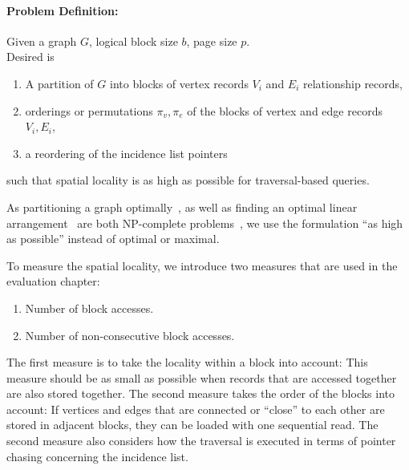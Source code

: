     \paragraph{Problem Definition:} Given a graph $G$, logical block size $b$, page size $p$. \\
    Desired is 
    \begin{enumerate}
     \item A partition of $G$ into blocks of vertex records $V_i$ and $E_i$ relationship records, 
     \item orderings or permutations $\pi_v, \pi_e$ of the blocks of vertex and edge records $V_i, E_i$,
     \item a reordering of the incidence list pointers
    \end{enumerate}
    such that spatial locality is as high as possible for traversal-based queries.
    
    As partitioning a graph optimally~\autocite{andreev2006balanced}, as well as finding an optimal linear arrangement~\autocite{garey1974some} are both NP-complete problems~\autocite{lewis1983computers}, we use the formulation ``as high as possible'' instead of optimal or maximal.
    
    To measure the spatial locality, we introduce two measures that are used in the evaluation chapter:
    \begin{enumerate}
     \item Number of block accesses.
     \item Number of non-consecutive block accesses.
    \end{enumerate}
    The first measure is to take the locality within a block into account:
This measure should be as small as possible when records that are accessed together are also stored together.
    The second measure takes the order of the blocks into account: 
    If vertices and edges that are connected or ``close'' to each other are stored in adjacent blocks, they can be loaded with one sequential read.
    The second measure also considers how the traversal is executed in terms of pointer chasing concerning the incidence list.
    
